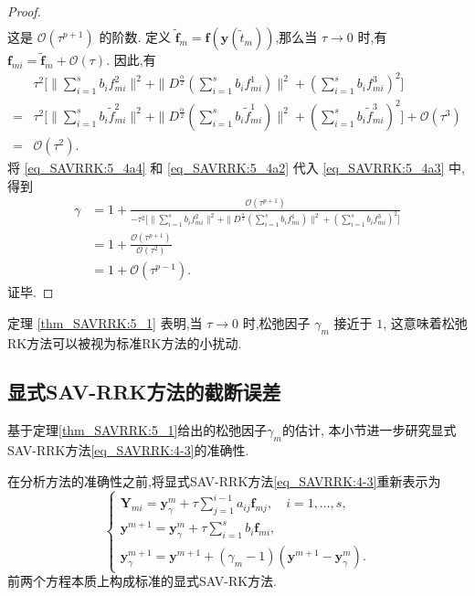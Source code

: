 \begin{proof}
\begin{align}
\end{align}
这是 $\mathcal{O}(\tau^{p+1})$ 的阶数.
定义 $\tilde{\bm{f}}_m=\bm{f}\left(\bm{y}\left(\tilde{t}_m\right)\right)$,那么当 $\tau\rightarrow 0$ 时,有 $\bm{f}_{m i}=\tilde{\bm{f}}_m+\mathcal{O}(\tau)$.
因此,有
\begin{align}\label{eq_SAVRRK:5_4a4}
	&\tau^2\Big[\|\sum\limits_{i=1}^{s}b_if_{mi}^2\|^2+ \|D^\frac{\alpha}{2}(\sum\limits_{i=1}^{s}b_if_{mi}^1)\|^2+(\sum\limits_{i=1}^{s}b_if_{mi}^3)^2\Big]\nonumber\\
	=&\tau^2\Big[\|\sum\limits_{i=1}^{s}b_i\tilde{f}_{mi}^2\|^2+ \|D^\frac{\alpha}{2}(\sum\limits_{i=1}^{s}b_i\tilde{f}_{mi}^1)\|^2+(\sum\limits_{i=1}^{s}b_i\tilde{f}_{mi}^3)^2\Big]+\mathcal{O}(\tau^3)\nonumber\\
	=&\mathcal{O}(\tau^2).
\end{align}
将 \eqref{eq_SAVRRK:5_4a4} 和 \eqref{eq_SAVRRK:5_4a2} 代入 \eqref{eq_SAVRRK:5_4a3} 中,得到
\begin{align}\label{eq_SAVRRK:5_4a5}
	\gamma&=1+\frac{\mathcal{O}(\tau^{p+1})}{-\tau^2\Big[\|\sum\limits_{i=1}^{s}b_if_{mi}^2\|^2+ \|D^\frac{\alpha}{2}(\sum\limits_{i=1}^{s}b_if_{mi}^1)\|^2+(\sum\limits_{i=1}^{s}b_if_{mi}^3)^2\Big]}\nonumber\\
	&=1+\frac{\mathcal{O}(\tau^{p+1})}{\mathcal{O}(\tau^2)}\nonumber\\
	&=1+\mathcal{O}(\tau^{p-1}).
\end{align}
证毕.
\end{proof}

\begin{remark}\label{rk_SAVRRK:5_1}
定理 \ref{thm_SAVRRK:5_1} 表明,当 $\tau\rightarrow 0$ 时,松弛因子 $\gamma_m$ 接近于 $1$,
这意味着松弛RK方法可以被视为标准RK方法的小扰动.
\end{remark}

\subsection{显式SAV-RRK方法的截断误差}
基于定理\ref{thm_SAVRRK:5_1}给出的松弛因子$\gamma_m$的估计, 本小节进一步研究显式SAV-RRK方法\eqref{eq_SAVRRK:4-3}的准确性.

在分析方法的准确性之前,将显式SAV-RRK方法\eqref{eq_SAVRRK:4-3}重新表示为
\begin{equation}
\left\{\begin{array}{l}
\bm{Y}_{m i}=\bm{y}_\gamma^m+\tau \sum\limits_{j=1}^{i-1} a_{i j} \bm{f}_{m j}, \quad i=1, \ldots, s, \\
\bm{y}^{m+1}=\bm{y}_\gamma^m+\tau \sum\limits_{i=1}^s b_i \bm{f}_{m i},\\
\bm{y}_\gamma^{m+1}=\bm{y}^{m+1}+\left(\gamma_m-1\right)\left(\bm{y}^{m+1}-\bm{y}_\gamma^m\right) .
\end{array}\right.\label{eq_SAVRRK:4-321}
\end{equation}
前两个方程本质上构成标准的显式SAV-RK方法.


